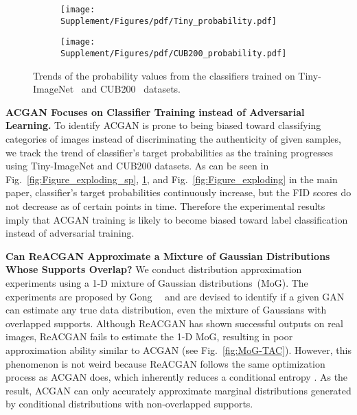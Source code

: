 \documentclass{article}
\begin{document}
\begin{figure}[t!]
    \centering
    \begin{subfigure}{0.40\textwidth}
    \texttt{[image: Supplement/Figures/pdf/Tiny\_probability.pdf]}
    \end{subfigure}
    \begin{subfigure}{0.40\textwidth}
    \texttt{[image: Supplement/Figures/pdf/CUB200\_probability.pdf]}
    \end{subfigure}
    \caption{Trends of the probability values from the classifiers trained on Tiny-ImageNet~\cite{Tiny} and CUB200~\cite{WelinderEtal2010} datasets.}
    \label{fig:biased_p}
\end{figure} \textbf{ACGAN Focuses on Classifier Training instead of Adversarial Learning.} To identify ACGAN is prone to being biased toward classifying categories of images instead of discriminating the authenticity of given samples, we track the trend of classifier's target probabilities as the training progresses using Tiny-ImageNet and CUB200 datasets. As can be seen in Fig.~\ref{fig:Figure_exploding_sp}, \ref{fig:biased_p}, and Fig.~\ref{fig:Figure_exploding} in the main paper, classifier's target probabilities continuously increase, but the FID scores do not decrease as of certain points in time. Therefore the experimental results imply that ACGAN training is likely to become biased toward label classification instead of adversarial training.

\textbf{Can ReACGAN Approximate a Mixture of Gaussian Distributions Whose Supports Overlap?} We conduct distribution approximation experiments using a 1-D mixture of Gaussian distributions~(MoG). The experiments are proposed by Gong~\etal~\cite{NIPS2019_8414} and are devised to identify if a given GAN can estimate any true data distribution, even the mixture of Gaussians with overlapped supports.  Although ReACGAN has shown successful outputs on real images, ReACGAN fails to estimate the 1-D MoG, resulting in poor approximation ability similar to ACGAN (see Fig.~\ref{fig:MoG-TAC}). However, this phenomenon is not weird because ReACGAN follows the same optimization process as ACGAN does, which inherently reduces a conditional entropy . As the result, ACGAN can only accurately approximate marginal distributions generated by conditional distributions with non-overlapped supports.
\end{document}
